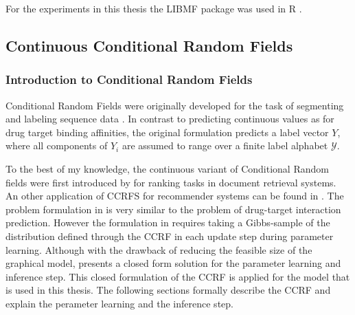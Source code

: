 For the experiments in this thesis the LIBMF package was used in R \cite{chin2016libmf}.

\subsection{Continuous Conditional Random Fields}

\subsubsection{Introduction to Conditional Random Fields}

Conditional Random Fields were originally developed for the task of segmenting and labeling sequence data \cite{lafferty2001conditional}. In contrast to predicting continuous values as for drug target binding affinities, the original formulation predicts a label vector $Y$, where all components of $Y_i$ are assumed to range over a finite label alphabet $\mathcal{Y}$. 


To the best of my knowledge, the continuous variant of Conditional Random fields were first introduced by \cite{qin2009global} for ranking tasks in document retrieval systems. An other application of CCRFS for recommender systems can be found in \cite{xin2009social}. The problem formulation in \cite{xin2009social} is very similar to the problem of drug-target interaction prediction. However the formulation in \cite{xin2009social} requires taking a Gibbs-sample of the distribution defined through the CCRF in each update step during parameter learning. Although with the drawback of reducing the feasible size of the graphical model, \cite{baltruvsaitis2013dimensional} presents a closed form solution for the parameter learning and inference step. This closed formulation of the CCRF is applied for the model that is used in this thesis. The following sections formally describe the CCRF and explain the perameter learning and the inference step.




